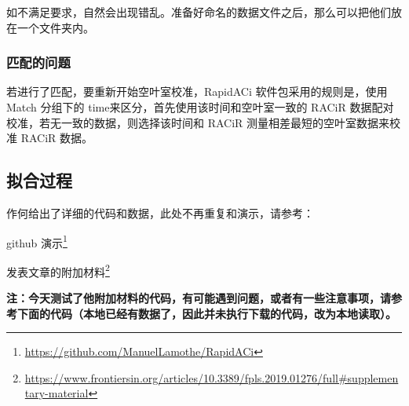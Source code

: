 \documentclass[
]{krantz}
\renewcommand{\href}[2]{#2\footnote{\url{#1}}}
\begin{document}
如不满足要求，自然会出现错乱。准备好命名的数据文件之后，那么可以把他们放在一个文件夹内。

\hypertarget{match-time}{%
\subsubsection{匹配的问题}\label{match-time}}

若进行了匹配，要重新开始空叶室校准，RapidACi 软件包采用的规则是，使用 Match 分组下的 time来区分，首先使用该时间和空叶室一致的 RACiR 数据配对校准，若无一致的数据，则选择该时间和 RACiR 测量相差最短的空叶室数据来校准 RACiR 数据。

\hypertarget{conifer-racir-fit}{%
\subsection{拟合过程}\label{conifer-racir-fit}}

作何给出了详细的代码和数据，此处不再重复和演示，请参考：

\href{https://github.com/ManuelLamothe/RapidACi}{github 演示}

\href{https://www.frontiersin.org/articles/10.3389/fpls.2019.01276/full\#supplementary-material}{发表文章的附加材料}

\textbf{注：今天测试了他附加材料的代码，有可能遇到问题，或者有一些注意事项，请参考下面的代码（本地已经有数据了，因此并未执行下载的代码，改为本地读取）。}
\end{document}
